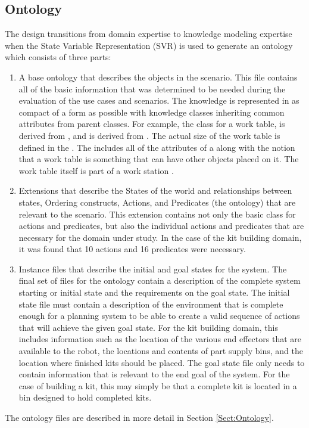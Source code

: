 \subsection{Ontology}
The design transitions from domain expertise to knowledge modeling expertise
when the State Variable Representation (SVR) is used to generate an ontology which consists of three parts:
\begin{enumerate}
 \item A base ontology that describes the objects in the scenario. This file contains
all of the basic information that was determined to be needed during the evaluation of
the use cases and scenarios. The knowledge is represented in as compact of a form as
possible with knowledge classes inheriting common attributes from parent classes.
For example, the class for a work table,  is derived from
, and  is derived from . The actual size of the work table
is defined in the . The  includes all of the attributes
of a  along with the notion that a work table is something that can have
other objects placed on it. The work table itself is part of a work station .
 \item Extensions that describe the States of the world and relationships between states,
Ordering constructs, Actions, and Predicates (the  ontology)
that are relevant to the scenario. This extension contains not only the basic class for
actions and predicates, but also the individual actions and predicates that are necessary
for the domain under study. In the case of the kit building domain, it was found that
10 actions and 16 predicates were necessary.
 \item Instance files that describe the initial and goal states for the system. The final set
of files for the ontology contain a description of the complete system starting or initial state and the
requirements on the goal state. The initial state file must contain a description of the environment that
is complete enough for a planning system to be able to create a valid sequence of actions that will achieve
the given goal state. For the kit building domain, this includes information such as the location of the
various end effectors that are available to the robot, the locations and contents of part supply bins, and
the location where finished kits should be placed. The goal state file only needs to contain information that
is relevant to the end goal of the system. For the case of building a kit, this may simply be that a complete
kit is located in a bin designed to hold completed kits.
\end{enumerate}
The ontology files are
described in more detail in Section \ref{Sect:Ontology}.

